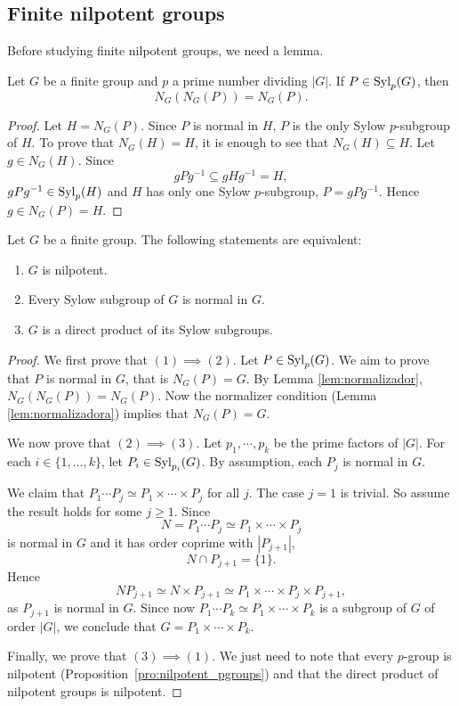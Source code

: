 \subsection{Finite nilpotent groups}

Before studying finite nilpotent groups, we need a lemma. 

\begin{lemma}
\label{lem:normalizador}
Let $G$ be a finite group and $p$ a prime number dividing $|G|$. 
If 
$P\in\mathrm{Syl}_p(G)$, then 
\[
N_G(N_G(P))=N_G(P). 
\]
\end{lemma}

\begin{proof}
Let $H=N_G(P)$. Since $P$ is normal in $H$, $P$ is the only Sylow $p$-subgroup of $H$. 
To prove that $N_G(H)=H$, it is enough to see that $N_G(H)\subseteq
H$. Let $g\in N_G(H)$. Since  
\[
gPg^{-1}\subseteq gHg^{-1}=H,
\]
$gPg^{-1}\in\mathrm{Syl}_p(H)$ and $H$ has only one Sylow $p$-subgroup, 
$P=gPg^{-1}$.  Hence $g\in N_G(P)=H$. 
\end{proof}

\begin{theorem}
\label{thm:nilpotente:eq}
Let $G$ be a finite group. The following statements are equivalent:
\begin{enumerate}
	\item $G$ is nilpotent. 
	\item Every Sylow subgroup of $G$ is normal in $G$. 
	\item $G$ is a direct product of its Sylow subgroups. 
\end{enumerate}
\end{theorem}

\begin{proof}
We first prove that $(1)\implies(2)$. Let $P\in\mathrm{Syl}_p(G)$. We aim to prove that $P$ 
is normal in $G$, that is $N_G(P)=G$. By Lemma \ref{lem:normalizador}, 
$N_G(N_G(P))=N_G(P)$. Now the normalizer condition (Lemma \ref{lem:normalizadora}) implies that 
$N_G(P)=G$.

We now prove that $(2)\implies(3)$. Let $p_1,\cdots,p_k$ be the prime factors of 
$|G|$. For each $i\in\{1,\dots,k\}$, let  $P_i\in\mathrm{Syl}_{p_i}(G)$.
By assumption, each $P_j$ is normal in $G$.

We claim that $P_1\cdots P_j\simeq P_1\times\cdots\times P_j$ for all $j$.
The case $j=1$ is trivial. So assume the result holds for some 
$j\geq 1$. Since 
\[
N=P_1\cdots P_j\simeq P_1\times\cdots\times P_j
\]
is normal in $G$ and it has order coprime with $|P_{j+1}|$, 
\[
N\cap P_{j+1}=\{1\}.
\]
Hence 
\[
	NP_{j+1}\simeq N\times P_{j+1}\simeq P_1\times\cdots\times P_j\times P_{j+1}, 
\]
as $P_{j+1}$ is normal in $G$. 
Since now $P_1\cdots P_k\simeq P_1\times\cdots\times P_k$ is a subgroup of 
$G$ of order $|G|$, we conclude that $G=P_1\times\cdots\times P_k$.

Finally, we prove that $(3)\implies(1)$. We just need to note that 
every 
$p$-group is nilpotent (Proposition~\ref{pro:nilpotent_pgroups}) and that the direct product
of nilpotent groups is nilpotent. 
\end{proof}

